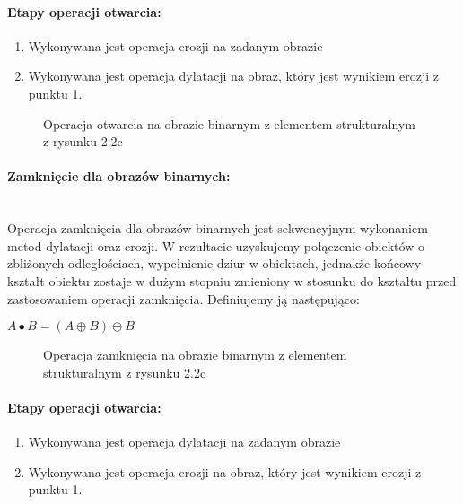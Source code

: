 \documentclass[a4paper,12pt,twoside,openany]{report}
\newcommand{\ImgPath}{.}
\begin{document}
\paragraph{Etapy operacji otwarcia:}
\begin{enumerate}
	\item Wykonywana jest operacja erozji na zadanym obrazie
	\item Wykonywana jest operacja dylatacji na obraz, który jest wynikiem erozji z punktu 1.
\end{enumerate}

\begin{figure}[H]
	\centering
	\caption{Operacja otwarcia na obrazie binarnym z elementem strukturalnym z rysunku 2.2c}
\end{figure}

\paragraph{Zamknięcie dla obrazów binarnych:}\mbox{} \\
\indent Operacja zamknięcia dla obrazów binarnych jest sekwencyjnym wykonaniem metod dylatacji oraz erozji. W rezultacie uzyskujemy połączenie obiektów o zbliżonych odległościach, wypełnienie dziur w obiektach, jednakże końcowy kształt obiektu zostaje w dużym stopniu zmieniony w stosunku do kształtu przed zastosowaniem operacji zamknięcia. Definiujemy ją następująco:
\begin{center}
	$ A \bullet B = (A \oplus B) \ominus B $ 
\end{center}

\begin{figure}[H]
	\centering
	\caption{Operacja zamknięcia na obrazie binarnym z elementem strukturalnym z rysunku 2.2c}
\end{figure}

\paragraph{Etapy operacji otwarcia:}
\begin{enumerate}
	\item Wykonywana jest operacja dylatacji na zadanym obrazie
	\item Wykonywana jest operacja erozji na obraz, który jest wynikiem erozji z punktu 1.
\end{enumerate}
\end{document}
